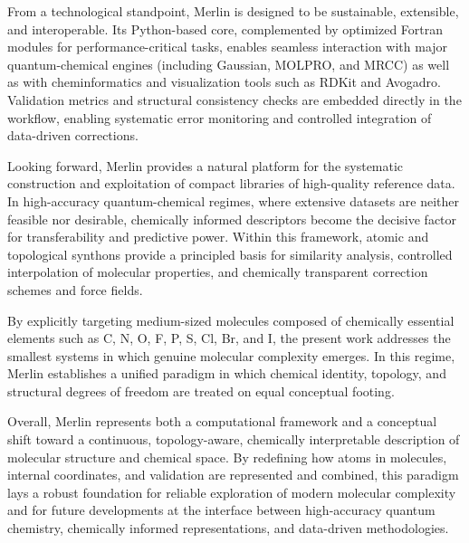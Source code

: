 \documentclass[journal=jctcce,manuscript=article]{achemso}
\begin{document}
From a technological standpoint, Merlin is designed to be sustainable, extensible, and interoperable. Its Python-based core, complemented by optimized Fortran modules for performance-critical tasks, enables seamless interaction with major quantum-chemical engines (including Gaussian, MOLPRO, and MRCC) as well as with cheminformatics and visualization tools such as RDKit and Avogadro. Validation metrics and structural consistency checks are embedded directly in the workflow, enabling systematic error monitoring and controlled integration of data-driven corrections.

Looking forward, Merlin provides a natural platform for the systematic construction and exploitation of compact libraries of high-quality reference data. In high-accuracy quantum-chemical regimes, where extensive datasets are neither feasible nor desirable, chemically informed descriptors become the decisive factor for transferability and predictive power. Within this framework, atomic and topological synthons provide a principled basis for similarity analysis, controlled interpolation of molecular properties, and chemically transparent correction schemes and force fields.

By explicitly targeting medium-sized molecules composed of chemically essential elements such as C, N, O, F, P, S, Cl, Br, and I, the present work addresses the smallest systems in which genuine molecular complexity emerges. In this regime, Merlin establishes a unified paradigm in which chemical identity, topology, and structural degrees of freedom are treated on equal conceptual footing.

Overall, Merlin represents both a computational framework and a conceptual shift toward a continuous, topology-aware, chemically interpretable description of molecular structure and chemical space. By redefining how atoms in molecules, internal coordinates, and validation are represented and combined, this paradigm lays a robust foundation for reliable exploration of modern molecular complexity and for future developments at the interface between high-accuracy quantum chemistry, chemically informed representations, and data-driven methodologies.
\end{document}
